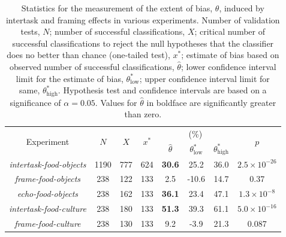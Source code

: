 \documentclass{sigchi}
\begin{document}
\begin{table}
\begin{center}
\begin{tabular}{c c c c c c c c }
	\toprule
	\multirow{2}{*}{Experiment} & \multirow{2}{*}{$N$} & 
	\multirow{2}{*}{$X$} & \multirow{2}{*}{$x^*$} & \multicolumn{3}{c}{(\%)}
		& \multirow{2}{*}{$p$}\\ \cline{5-7} \noalign{\smallskip}
	& & & & $\hat{\theta}$ & $\theta^*_\mathrm{low}$ 
		& $\theta^*_\mathrm{high}$  \\
	\midrule
	\textit{intertask-food-objects} & 1190 & 777 & 624 & \textbf{30.6} 
		& 25.2 & 36.0 & $2.5 \times 10^{-26}$ \\
	\textit{frame-food-objects} & 238 & 122 & 133 & 2.5 & -10.6 & 14.7
		& 0.37 \\
	\textit{echo-food-objects} & 238 & 162 &  133 & \textbf{36.1} & 23.4 
		& 47.1 & $1.3 \times 10^{-8}$ \\
	\textit{intertask-food-culture} & 238 & 180 & 133 & \textbf{51.3} & 39.3 
		& 61.1 & $5.0 \times 10^{-16}$ \\
	\textit{frame-food-culture} & 238 & 130 & 133 & 9.2 & -3.9 & 21.3 
		& 0.087\\
	\bottomrule

\end{tabular}

\caption{Statistics for the measurement of the extent of bias, $\theta$,
	induced by intertask and framing effects in various experiments.
	Number of validation tests, $N$; number of successful classifications, 
	$X$; critical number of successful classifications to reject the null 
	hypotheses that the classifier does no better than chance 
	(one-tailed test), $x^*$; 
	estimate of bias based on observed number of successful
	classifications, $\hat{\theta}$; lower confidence interval limit 
	for the estimate of bias, $\theta^*_\mathrm{low}$; upper confidence 
	interval limit for same, $\theta^*_\mathrm{high}$.  Hypothesis test and 
	confidence intervals are based on a significance of $\alpha=0.05$.
	Values for $\hat{\theta}$ in boldface are significantly greater than zero.
}
\label{table:theta}
\end{center}
\end{table}
\end{document}
